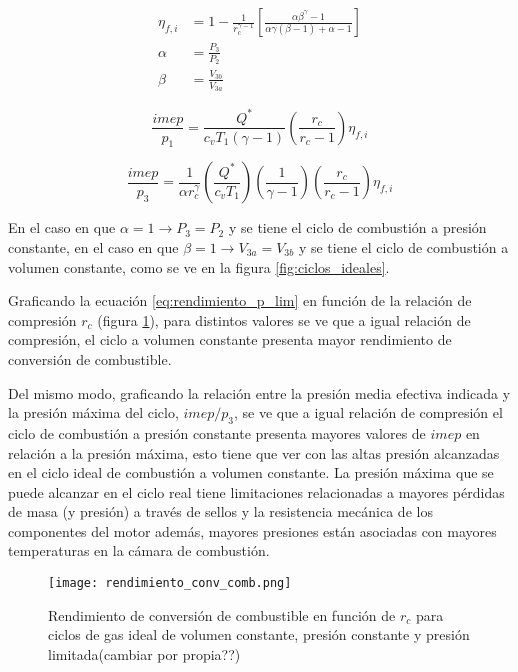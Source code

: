 \begin{align}
    \label{eq:rendimiento_p_lim}
    \eta_{f,i} &= 1 - \frac{1}{r_c^{\gamma - 1}} \left[ \frac{\alpha \beta^\gamma-1}{\alpha \gamma (\beta-1)+\alpha-1} \right]\\ \alpha &= \frac{P_3}{P_2}\\ \beta &= \frac{V_{3b}}{V_{3a}}
\end{align}

\begin{equation}
    \label{eq:imep_p1} \frac{imep}{p_1} = \frac{Q^*}{c_v T_1 (\gamma-1)} \left( \frac{r_c}{r_c-1} \right) \eta_{f,i}
\end{equation}

\begin{equation}
    \label{eq:imep_p3} \frac{imep}{p_3} = \frac{1}{\alpha r_c^\gamma} \left( \frac{Q^*}{c_v T_1} \right) \left(\frac{1}{\gamma-1} \right) \left( \frac{r_c}{r_c-1} \right) \eta_{f,i}
\end{equation}

En el caso en que  $\alpha=1 \rightarrow P_3=P_2$ y se tiene el ciclo de
combustión a presión constante, en el caso en que
$\beta=1 \rightarrow V_{3a}=V_{3b}$ y se tiene el ciclo de combustión a volumen
constante, como se ve en la figura \ref{fig:ciclos_ideales}.

Graficando la ecuación \ref{eq:rendimiento_p_lim} en función de la relación de
compresión $r_c$ (figura \ref{fig:rendimientos}), para distintos valores se ve
que a igual relación de compresión, el ciclo a volumen constante presenta mayor
rendimiento de conversión de combustible.

Del mismo modo, graficando la relación entre la presión media efectiva indicada
y la presión máxima del ciclo, $imep/p_3$, se ve que a igual relación de
compresión el ciclo de combustión a presión constante presenta mayores valores
de $imep$ en relación a la presión máxima, esto tiene que ver con las altas
presión alcanzadas en el ciclo ideal de combustión a volumen constante.
%
La presión máxima que se puede alcanzar en el ciclo real tiene limitaciones
relacionadas a mayores pérdidas de masa (y presión) a través de sellos y la
resistencia mecánica de los componentes del motor además, mayores presiones
están asociadas con mayores temperaturas en la cámara de combustión.

\begin{figure} \centering
\texttt{[image: rendimiento\_conv\_comb.png]}
    \caption{Rendimiento de conversión de combustible en función de $r_c$ para
ciclos de gas ideal de volumen constante, presión constante y presión
limitada(cambiar por propia??)} \label{fig:rendimientos}
\end{figure}


